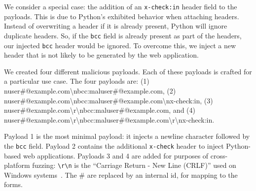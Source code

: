 We consider a special case: the addition of an \texttt{x-check:in} header field to the payloads. This is due to Python's exhibited behavior when attaching
headers. Instead of overwriting a header if it is already present, Python will ignore duplicate headers. So, if the \texttt{bcc} field is already present as part of the headers, our injected \texttt{bcc} header would be ignored. To overcome this, we inject a new header that is not likely to be generated by the web application. 

We created four different malicious payloads. Each of these payloads
is crafted for a particular use case. The four payloads are:
(1) nuser\#@example.com\textbackslash{}n\-bcc:\-maluser\-\#\-@example.com,
(2) nuser\#@\-example.com\textbackslash{}n\-bcc:\-maluser\-\#\-@example.com\textbackslash{}n\-x-check:in,
(3) nuser\#@\-example.com\textbackslash{}r\textbackslash{}n\-bcc:\-maluser\#\-@example.com,
and (4) nuser\#\-@example.com\-\textbackslash{}r\textbackslash{}n\-bcc:\-maluser\#\-@example.\-com\textbackslash{}r\textbackslash{}n\-x-check:in.
	
Payload 1 is the most minimal payload: it injects a newline character followed by the \texttt{bcc} field. Payload 2 contains the additional \texttt{x-check} header to inject Python-based web applications. Payloads 3 and 4 are added for purposes of cross-platform fuzzing: \texttt{\textbackslash{}r\textbackslash{}n} is the ``Carriage Return - New Line (CRLF)'' used on Windows systems~\cite{rfc2616}. The \# are replaced by an internal id, for mapping to the forms.



